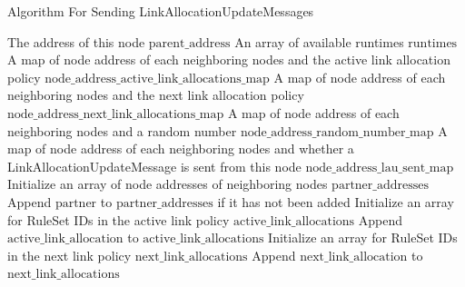 \begin{algorithm}[H]
  \caption{Algorithm For Sending LinkAllocationUpdateMessages}
  \begin{algorithmic}[1]
\Require The address of this node $\text{parent\_address}$
  \Require An array of available runtimes $\text{runtimes}$
  \Require A map of node address of each neighboring nodes and the active link allocation policy $\text{node\_address\_active\_link\_allocations\_map}$
  \Require A map of node address of each neighboring nodes and the next link allocation policy $\text{node\_address\_next\_link\_allocations\_map}$
  \Require A map of node address of each neighboring nodes and a random number $\text{node\_address\_random\_number\_map}$
  \Require A map of node address of each neighboring nodes and whether a LinkAllocationUpdateMessage is sent from this node $\text{node\_address\_lau\_sent\_map}$
    \State Initialize an array of node addresses of neighboring nodes $\text{partner\_addresses}$
      \State Append $\text{partner}$ to $\text{partner\_addresses}$ if it has not been added
      \EndFor
    \EndFor
      \State Initialize an array for RuleSet IDs in the active link policy $\text{active\_link\_allocations}$
            \State Append $\text{active\_link\_allocation}$ to $\text{active\_link\_allocations}$
          \EndFor
        \EndIf
      \State Initialize an array for RuleSet IDs in the next link policy $\text{next\_link\_allocations}$
            \State Append $\text{next\_link\_allocation}$ to $\text{next\_link\_allocations}$
          \EndFor
        \EndIf
        \EndFor
        \EndFor
      \EndFor
    \end{algorithmic}
  \end{algorithm}

